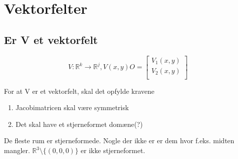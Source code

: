 \section{Vektorfelter}

\subsection{Er V et vektorfelt}
\[
V: \mathbb R^k \to \mathbb R^j, V(x,y) O = \begin{bmatrix}V_1(x,y)\\
V_2(x,y)\\
\end{bmatrix}
\]

For at V er et vektorfelt, skal det opfylde kravene

\begin{enumerate}
    \item Jacobimatricen skal være symmetrisk
    \item Det skal have et stjerneformet domæne(?)
\end{enumerate}


De fleste rum er stjerneformede. Nogle der ikke er er dem hvor f.eks. midten mangler.
$\mathbb R^3 \setminus \{(0,0,0)\}$ er ikke stjerneformet.